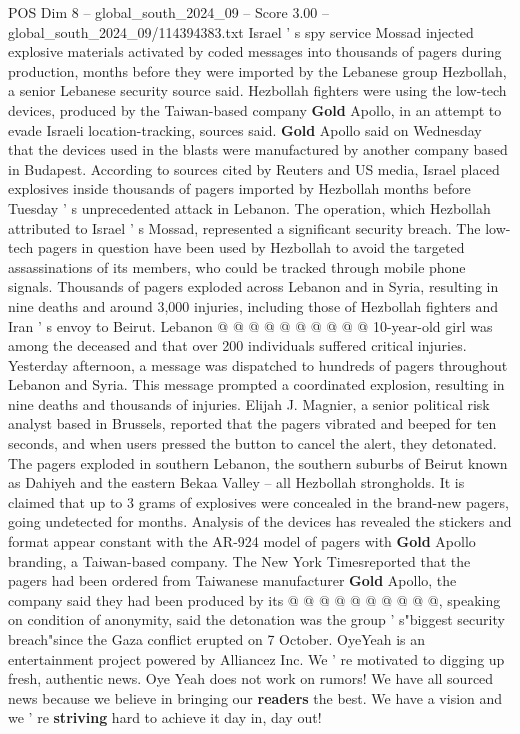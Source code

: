 \begin{textsample}{POS Dim 8 – global\_south\_2024\_09 – Score 3.00 – global\_south\_2024\_09/114394383.txt}  \label{ex:f8_pos_289}
Israel ' s spy service Mossad injected explosive materials activated by coded messages into thousands of pagers during production, months before they were imported by the Lebanese group Hezbollah, a senior Lebanese security source said.
Hezbollah fighters were using the low-tech devices, produced by the Taiwan-based company \textbf{Gold} Apollo, in an attempt to evade Israeli location-tracking, sources said. \textbf{Gold} Apollo said on Wednesday that the devices used in the blasts were manufactured by another company based in Budapest.
According to sources cited by Reuters and US media, Israel placed explosives inside thousands of pagers imported by Hezbollah months before Tuesday ' s unprecedented attack in Lebanon.
The operation, which Hezbollah attributed to Israel ' s Mossad, represented a significant security breach.
The low-tech pagers in question have been used by Hezbollah to avoid the targeted assassinations of its members, who could be tracked through mobile phone signals.
Thousands of pagers exploded across Lebanon and in Syria, resulting in nine deaths and around 3,000 injuries, including those of Hezbollah fighters and Iran ' s envoy to Beirut.
Lebanon @ @ @ @ @ @ @ @ @ @ 10-year-old girl was among the deceased and that over 200 individuals suffered critical injuries.
Yesterday afternoon, a message was dispatched to hundreds of pagers throughout Lebanon and Syria.
This message prompted a coordinated explosion, resulting in nine deaths and thousands of injuries.
Elijah J.
Magnier, a senior political risk analyst based in Brussels, reported that the pagers vibrated and beeped for ten seconds, and when users pressed the button to cancel the alert, they detonated.
The pagers exploded in southern Lebanon, the southern suburbs of Beirut known as Dahiyeh and the eastern Bekaa Valley -- all Hezbollah strongholds.
It is claimed that up to 3 grams of explosives were concealed in the brand-new pagers, going undetected for months.
Analysis of the devices has revealed the stickers and format appear constant with the AR-924 model of pagers with \textbf{Gold} Apollo branding, a Taiwan-based company.
The New York Timesreported that the pagers had been ordered from Taiwanese manufacturer \textbf{Gold} Apollo, the company said they had been produced by its @ @ @ @ @ @ @ @ @ @, speaking on condition of anonymity, said the detonation was the group ' s"biggest security breach"since the Gaza conflict erupted on 7 October.
OyeYeah is an entertainment project powered by Alliancez Inc.
We ' re motivated to digging up fresh, authentic news.
Oye Yeah does not work on rumors!
We have all sourced news because we believe in bringing our \textbf{readers} the best.
We have a vision and we ' re \textbf{striving} hard to achieve it day in, day out!

\end{textsample}
